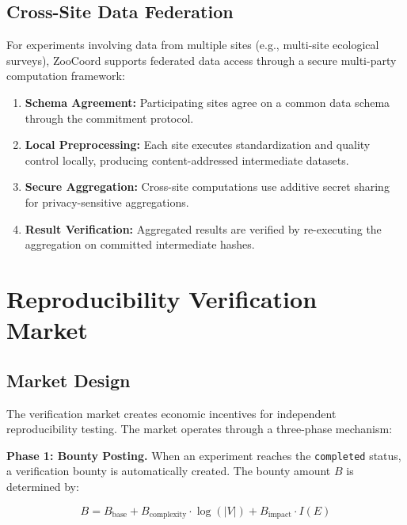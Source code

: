 \documentclass[11pt,a4paper]{article}
\begin{document}
\subsection{Cross-Site Data Federation}

For experiments involving data from multiple sites (e.g., multi-site ecological surveys), ZooCoord supports federated data access through a secure multi-party computation framework:

\begin{enumerate}[leftmargin=*]
    \item \textbf{Schema Agreement:} Participating sites agree on a common data schema through the commitment protocol.
    \item \textbf{Local Preprocessing:} Each site executes standardization and quality control locally, producing content-addressed intermediate datasets.
    \item \textbf{Secure Aggregation:} Cross-site computations use additive secret sharing for privacy-sensitive aggregations.
    \item \textbf{Result Verification:} Aggregated results are verified by re-executing the aggregation on committed intermediate hashes.
\end{enumerate}

\section{Reproducibility Verification Market}
\label{sec:market}

\subsection{Market Design}

The verification market creates economic incentives for independent reproducibility testing.
The market operates through a three-phase mechanism:

\textbf{Phase 1: Bounty Posting.}
When an experiment reaches the \texttt{completed} status, a verification bounty is automatically created.
The bounty amount $B$ is determined by:

\begin{equation}
    B = B_{\text{base}} + B_{\text{complexity}} \cdot \log(|V|) + B_{\text{impact}} \cdot I(E)
\end{equation}
\end{document}
